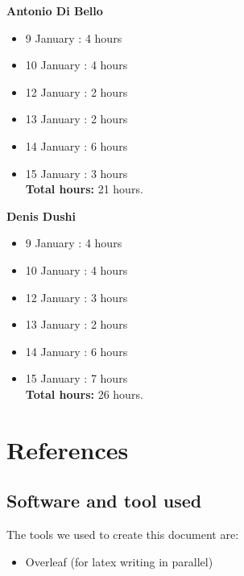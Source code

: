 \documentclass[a4paper]{article}
\begin{document}
\textbf{Antonio Di Bello}
\begin{itemize}
\item 9 January  : 4 hours
\item 10 January : 4 hours
\item 12 January : 2 hours
\item 13 January : 2 hours
\item 14 January : 6 hours 
\item 15 January : 3 hours \\

\textbf{Total hours:} 21 hours.
\end{itemize}


\textbf{Denis Dushi}
\begin{itemize}
\item 9 January  :  4 hours
\item 10 January :  4 hours
\item 12 January :  3 hours
\item 13 January :  2 hours
\item 14 January :  6 hours
\item 15 January :  7 hours\\

\textbf{Total hours:} 26 hours.
\end{itemize}

\newpage
\section{References}
\subsection{Software and tool used}
The tools we used to create this document are:
\begin{itemize}
\item Overleaf (for latex writing in parallel)
\end{itemize}
\end{document}
